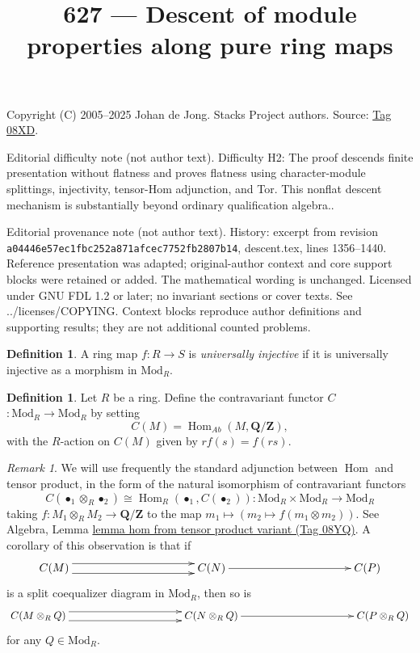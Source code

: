 \documentclass{amsart}
\theoremstyle{plain}
\theoremstyle{definition}
\newtheorem{definition}[subsection]{Definition}
\theoremstyle{remark}
\newtheorem{remark}[subsection]{Remark}
\numberwithin{equation}{subsection}
\def\Hom{\mathop{\mathrm{Hom}}\nolimits}
\begin{document}
\title[Stacks Project, Tag 08XD]{627 --- Descent of module properties along pure ring maps}
\maketitle
\noindent Copyright (C) 2005--2025 Johan de Jong. Stacks Project authors. Source: \href{https://stacks.math.columbia.edu/tag/08XD}{Tag 08XD}.

\noindent Editorial difficulty note (not author text). Difficulty H2: The proof descends finite presentation without flatness and proves flatness using character-module splittings, injectivity, tensor-Hom adjunction, and Tor. This nonflat descent mechanism is substantially beyond ordinary qualification algebra..

\noindent Editorial provenance note (not author text). History: excerpt from revision \texttt{a0444\allowbreak 6e57e\allowbreak c1fbc\allowbreak 252a8\allowbreak 71afc\allowbreak ec775\allowbreak 2fb28\allowbreak 07b14}, descent.tex, lines 1356--1440. Reference presentation was adapted; original-author context and core support blocks were retained or added. The mathematical wording is unchanged. Licensed under GNU FDL 1.2 or later; no invariant sections or cover texts. See ../licenses/COPYING. Context blocks reproduce author definitions and supporting results; they are not additional counted problems.

\begin{definition}
\label{definition-universally-injective}
A ring map $f: R \to S$ is {\it universally injective}
if it is universally injective as a morphism in $\text{Mod}_R$.
\end{definition}

\begin{definition}
\label{definition-C}
Let $R$ be a ring. Define the contravariant functor
{\it $C$} $ : \text{Mod}_R \to \text{Mod}_R$ by setting
$$
C(M) = \Hom_{\textit{Ab}}(M, \mathbf{Q}/\mathbf{Z}),
$$
with the $R$-action on $C(M)$ given by $rf(s) = f(rs)$.
\end{definition}

\begin{remark}
\label{remark-adjunction}
We will use frequently the standard adjunction between $\Hom$ and tensor 
product, in the form of the natural isomorphism of contravariant functors
\begin{equation}
\label{equation-adjunction}
C(\bullet_1 \otimes_R \bullet_2) \cong \Hom_R(\bullet_1, C(\bullet_2)): 
\text{Mod}_R \times \text{Mod}_R \to \text{Mod}_R
\end{equation}
taking $f: M_1 \otimes_R M_2 \to \mathbf{Q}/\mathbf{Z}$ to the map $m_1 \mapsto 
(m_2 \mapsto f(m_1 \otimes m_2))$. See
Algebra, Lemma \href{https://stacks.math.columbia.edu/tag/08YQ}{lemma hom from tensor product variant (Tag 08YQ)}.
A corollary of this observation is that if
$$
\xymatrix@C=9pc{
C(M) \ar@<1ex>[r] \ar@<-1ex>[r] & C(N) \ar[r] & C(P)
}
$$
is a split coequalizer diagram in $\text{Mod}_R$, then so is
$$
\xymatrix@C=9pc{
C(M \otimes_R Q) \ar@<1ex>[r] \ar@<-1ex>[r] & C(N \otimes_R Q) \ar[r] & C(P 
\otimes_R Q)
}
$$
for any $Q \in \text{Mod}_R$.
\end{remark}
\end{document}
